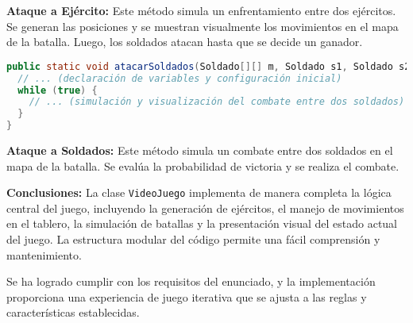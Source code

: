 \textbf{Ataque a Ejército:} Este método simula un enfrentamiento entre dos ejércitos. Se generan las posiciones y se muestran visualmente los movimientos en el mapa de la batalla. Luego, los soldados atacan hasta que se decide un ganador.

\begin{lstlisting}[language=Java]
public static void atacarSoldados(Soldado[][] m, Soldado s1, Soldado s2) {
  // ... (declaración de variables y configuración inicial)
  while (true) {
    // ... (simulación y visualización del combate entre dos soldados)
  }
}
\end{lstlisting}

\textbf{Ataque a Soldados:} Este método simula un combate entre dos soldados en el mapa de la batalla. Se evalúa la probabilidad de victoria y se realiza el combate.

\textbf{Conclusiones:}
La clase \texttt{VideoJuego} implementa de manera completa la lógica central del juego, incluyendo la generación de ejércitos, el manejo de movimientos en el tablero, la simulación de batallas y la presentación visual del estado actual del juego. La estructura modular del código permite una fácil comprensión y mantenimiento.

Se ha logrado cumplir con los requisitos del enunciado, y la implementación proporciona una experiencia de juego iterativa que se ajusta a las reglas y características establecidas.
